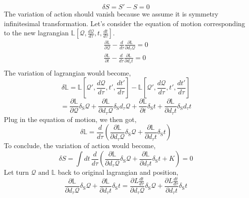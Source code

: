 \documentclass[12pt]{article}
\numberwithin{equation}{section}
\begin{document}
\begin{equation}
    \delta S = S' - S = 0
\end{equation}
The variation of action should vanish because we assume it is symmetry infinitesimal transformation.
Let's consider the equation of motion corresponding to the new lagrangian $\mathbb{L}\left[\mathcal{Q},\frac{d\mathcal{Q}}{d\tau},t, \frac{dt}{d\tau}\right]$.
\begin{equation}
    \begin{split}
        \frac{\partial\mathbb{L}}{\partial\mathcal{Q}}-\frac{d}{d\tau}\frac{\partial\mathbb{L}}{\partial d_{\tau}\mathcal{Q}} = 0\\
        \frac{\partial\mathbb{L}}{\partial t}-\frac{d}{d\tau}\frac{\partial\mathbb{L}}{\partial d_{\tau}t} = 0\\
    \end{split}
\end{equation}
The variation of lagrangian would become,
\begin{equation}
    \delta\mathbb{L} = \mathbb{L}\left[\mathcal{Q}',\frac{d\mathcal{Q}}{d\tau}, t', \frac{dt'}{d\tau}\right] - \mathbb{L}\left[\mathcal{Q}',\frac{d\mathcal{Q}}{d\tau}, t', \frac{dt'}{d\tau}\right]
\end{equation}
\[ = \frac{\partial\mathbb{L}}{\partial\mathcal{Q}}\delta_{\text{S}}\mathcal{Q}+\frac{\partial\mathbb{L}}{\partial d_{\tau}\mathcal{Q}}\delta_{\text{S}}d_{\tau}\mathcal{Q}+\frac{\partial\mathbb{L}}{\partial t}\delta_{\text{S}}t+\frac{\partial\mathbb{L}}{\partial d_{\tau}t}\delta_{\text{S}}d_{\tau}t\]
Plug in the equation of motion, we then got,
\[\delta\mathbb{L} = \frac{d}{d\tau}\left(\frac{\partial\mathbb{L}}{\partial d_{\tau}\mathcal{Q}}\delta_{\text{S}}\mathcal{Q}+\frac{\partial\mathbb{L}}{\partial d_{\tau}t}\delta_{\text{S}}t\right)\]
To conclude, the variation of action would become,
\begin{equation}
    \delta S = \int{dt\,\frac{d}{d\tau}\left(\frac{\partial\mathbb{L}}{\partial d_{\tau}\mathcal{Q}}\delta_{\text{S}}\mathcal{Q}+\frac{\partial\mathbb{L}}{\partial d_{\tau}t}\delta_{\text{S}}t+K\right)} = 0
\end{equation}
Let turn $\mathcal{Q}\text{ and }\mathbb{L}$ back to original lagrangian and position,
\[\frac{\partial\mathbb{L}}{\partial d_{\tau}\mathcal{Q}}\delta_{\text{S}}\mathcal{Q}+\frac{\partial\mathbb{L}}{\partial d_{\tau}t}\delta_{\text{S}}t = \frac{\partial L\frac{dt}{d\tau}}{\partial d_{\tau}\mathcal{Q}}\delta_{\text{S}}\mathcal{Q}+\frac{\partial L\frac{dt}{d\tau}}{\partial d_{\tau}t}\delta_{\text{S}}t\]
\end{document}
